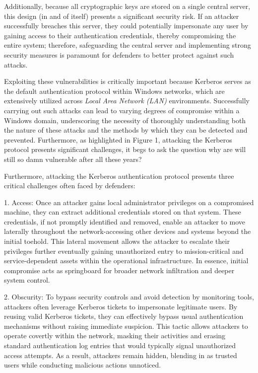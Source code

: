 Additionally, because all cryptographic keys are stored on a single central server, this design (in and of itself) presents a significant security risk. If an attacker successfully breaches this server, they could potentially impersonate any user by gaining access to their authentication credentials, thereby compromising the entire system; therefore, safeguarding the central server and implementing strong security measures is paramount for defenders to better protect against such attacks.

Exploiting these vulnerabilities is critically important because Kerberos serves as the default authentication protocol within Windows networks, which are extensively utilized across \textit{Local Area Network (LAN) } environments. Successfully carrying out such attacks can lead to varying degrees of compromise within a Windows domain, underscoring the necessity of thoroughly understanding both the nature of these attacks and the methods by which they can be detected and prevented. Furthermore, as highlighted in Figure 1, attacking the Kerberos protocol presents significant challenges, it begs to ask the question why are will still so damn vulnerable after all these years?

Furthermore, attacking the Kerberos authentication protocol presents three critical challenges often faced by defenders:

1. Access:
Once an attacker gains local administrator privileges on a compromised machine, they can extract additional credentials stored on that system. These credentials, if not promptly identified and removed, enable an attacker to move laterally throughout the network-accessing other devices and systems beyond the initial toehold. This lateral movement allows the attacker to escalate their privileges further eventually gaining unauthorized entry to mission-critical and service-dependent assets within the operational infrastructure. In essence, initial compromise acts as springboard for broader network infiltration and deeper system control.

2. Obscurity:
To bypass security controls and avoid detection by monitoring tools, attackers often leverage Kerberos tickets to impersonate legitimate users. By reusing valid Kerberos tickets, they can effectively bypass usual authentication mechanisms without raising immediate suspicion. This tactic allows attackers to operate covertly within the network, masking their activities and erasing standard authentication log entries that would typically signal unauthorized access attempts. As a result, attackers remain hidden, blending in as trusted users while conducting malicious actions unnoticed.

